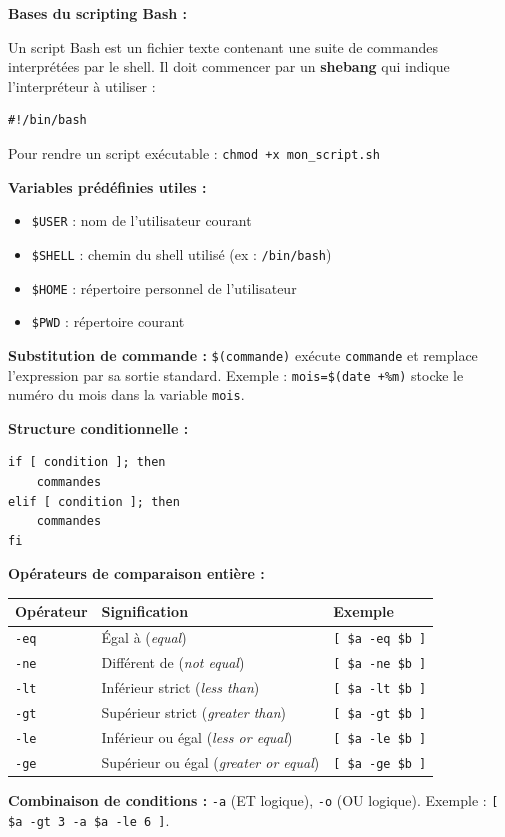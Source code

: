 \documentclass[a4paper,11pt]{article}
\theoremstyle{plain}
\theoremstyle{definition}
\begin{document}
\begin{rappel}
\textbf{Bases du scripting Bash :}

Un script Bash est un fichier texte contenant une suite de commandes interprétées par le shell. Il doit commencer par un \textbf{shebang} qui indique l'interpréteur à utiliser :
\begin{lstlisting}[numbers=none]
#!/bin/bash
\end{lstlisting}

Pour rendre un script exécutable : \texttt{chmod +x mon\_script.sh}

\medskip
\textbf{Variables prédéfinies utiles :}
\begin{itemize}
    \item \texttt{\$USER} : nom de l'utilisateur courant
    \item \texttt{\$SHELL} : chemin du shell utilisé (ex : \texttt{/bin/bash})
    \item \texttt{\$HOME} : répertoire personnel de l'utilisateur
    \item \texttt{\$PWD} : répertoire courant
\end{itemize}

\medskip
\textbf{Substitution de commande :} \texttt{\$(commande)} exécute \texttt{commande} et remplace l'expression par sa sortie standard. Exemple : \texttt{mois=\$(date +\%m)} stocke le numéro du mois dans la variable \texttt{mois}.

\medskip
\textbf{Structure conditionnelle :}
\begin{lstlisting}[numbers=none]
if [ condition ]; then
    commandes
elif [ condition ]; then
    commandes
fi
\end{lstlisting}

\medskip
\textbf{Opérateurs de comparaison entière :}

\begin{center}
\begin{tabular}{lll}
\toprule
\textbf{Opérateur} & \textbf{Signification} & \textbf{Exemple} \\
\midrule
\texttt{-eq} & Égal à (\textit{equal}) & \texttt{[ \$a -eq \$b ]} \\
\texttt{-ne} & Différent de (\textit{not equal}) & \texttt{[ \$a -ne \$b ]} \\
\texttt{-lt} & Inférieur strict (\textit{less than}) & \texttt{[ \$a -lt \$b ]} \\
\texttt{-gt} & Supérieur strict (\textit{greater than}) & \texttt{[ \$a -gt \$b ]} \\
\texttt{-le} & Inférieur ou égal (\textit{less or equal}) & \texttt{[ \$a -le \$b ]} \\
\texttt{-ge} & Supérieur ou égal (\textit{greater or equal}) & \texttt{[ \$a -ge \$b ]} \\
\bottomrule
\end{tabular}
\end{center}

\medskip
\textbf{Combinaison de conditions :} \texttt{-a} (ET logique), \texttt{-o} (OU logique). Exemple : \texttt{[ \$a -gt 3 -a \$a -le 6 ]}.
\end{rappel}
\end{document}
